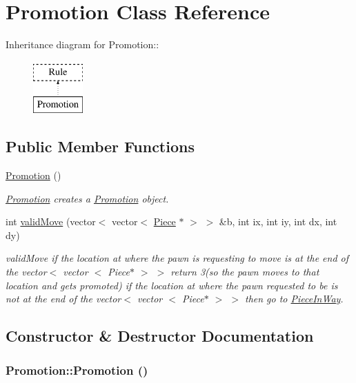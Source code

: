 \hypertarget{classPromotion}{
\section{Promotion Class Reference}
\label{classPromotion}
}
Inheritance diagram for Promotion::\begin{figure}[H]
\begin{center}
\leavevmode
\includegraphics[height=2cm]{classPromotion}
\end{center}
\end{figure}
\subsection*{Public Member Functions}
\begin{DoxyCompactItemize}
\item 
\hyperlink{classPromotion_aa10833a0510fd7fdf3a8b7019ae61531}{Promotion} ()
\begin{DoxyCompactList}\small\item\em \hyperlink{classPromotion}{Promotion} creates a \hyperlink{classPromotion}{Promotion} object. \item\end{DoxyCompactList}\item 
int \hyperlink{classPromotion_abbf445a4b494712e0b8d8b6b3e69e0cf}{validMove} (vector$<$ vector$<$ \hyperlink{classPiece}{Piece} $\ast$ $>$ $>$ \&b, int ix, int iy, int dx, int dy)
\begin{DoxyCompactList}\small\item\em validMove if the location at where the pawn is requesting to move is at the end of the vector$<$ vector $<$ Piece$\ast$ $>$ $>$ return 3(so the pawn moves to that location and gets promoted) if the location at where the pawn requested to be is not at the end of the vector$<$ vector $<$ Piece$\ast$ $>$ $>$ then go to \hyperlink{classPieceInWay}{PieceInWay}. \item\end{DoxyCompactList}\end{DoxyCompactItemize}


\subsection{Constructor \& Destructor Documentation}
\hypertarget{classPromotion_aa10833a0510fd7fdf3a8b7019ae61531}{
\subsubsection[{Promotion}]{\setlength{\rightskip}{0pt plus 5cm}Promotion::Promotion ()}}
\label{classPromotion_aa10833a0510fd7fdf3a8b7019ae61531}


